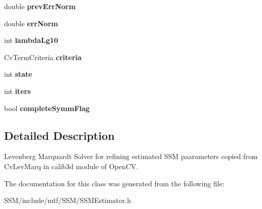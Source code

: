 \begin{DoxyCompactItemize}
\item 
\hypertarget{classLevMarq_ab4eda72ffe360d5b8a85bd7240505dc8}{double {\bfseries prev\-Err\-Norm}}\label{classLevMarq_ab4eda72ffe360d5b8a85bd7240505dc8}

\item 
\hypertarget{classLevMarq_a77ff573168949fedc7d7c5edf9079e5a}{double {\bfseries err\-Norm}}\label{classLevMarq_a77ff573168949fedc7d7c5edf9079e5a}

\item 
\hypertarget{classLevMarq_a0f143ad88c9c8825b11e0a7554f448da}{int {\bfseries lambda\-Lg10}}\label{classLevMarq_a0f143ad88c9c8825b11e0a7554f448da}

\item 
\hypertarget{classLevMarq_a2aa05304ef18ed081a3441d6a322095a}{Cv\-Term\-Criteria {\bfseries criteria}}\label{classLevMarq_a2aa05304ef18ed081a3441d6a322095a}

\item 
\hypertarget{classLevMarq_abc150716b5ae44cc893cd9cdd68678e6}{int {\bfseries state}}\label{classLevMarq_abc150716b5ae44cc893cd9cdd68678e6}

\item 
\hypertarget{classLevMarq_a962aabb6f91fd7ab62dc8e3c1c0587fc}{int {\bfseries iters}}\label{classLevMarq_a962aabb6f91fd7ab62dc8e3c1c0587fc}

\item 
\hypertarget{classLevMarq_a27165a637c591387639f1ec8e687e3b5}{bool {\bfseries complete\-Symm\-Flag}}\label{classLevMarq_a27165a637c591387639f1ec8e687e3b5}

\end{DoxyCompactItemize}


\subsection{Detailed Description}
Levenberg Marquardt Solver for refining estimated S\-S\-M paarameters copied from Cv\-Lev\-Marq in calib3d module of Open\-C\-V. 

The documentation for this class was generated from the following file\-:\begin{DoxyCompactItemize}
\item 
S\-S\-M/include/mtf/\-S\-S\-M/S\-S\-M\-Estimator.\-h\end{DoxyCompactItemize}
